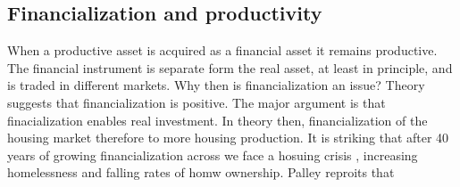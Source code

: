 %
%



\subsection{Financialization and productivity}

When  a productive asset is acquired as a financial asset it remains productive.  The financial instrument is separate form the real asset, at least in principle, and is traded in different markets. Why then is financialization an issue?  Theory suggests that financialization is positive.  The major argument is that finacialization enables real investment. In theory then, financialization of the housing market therefore  to more housing production. It is striking that after 40 years of growing financialization across we face a hosuing crisis , increasing homelessness and falling rates of homw ownership.  Palley \cite{palleyFinancializationWhatIt2007} reproits that 

